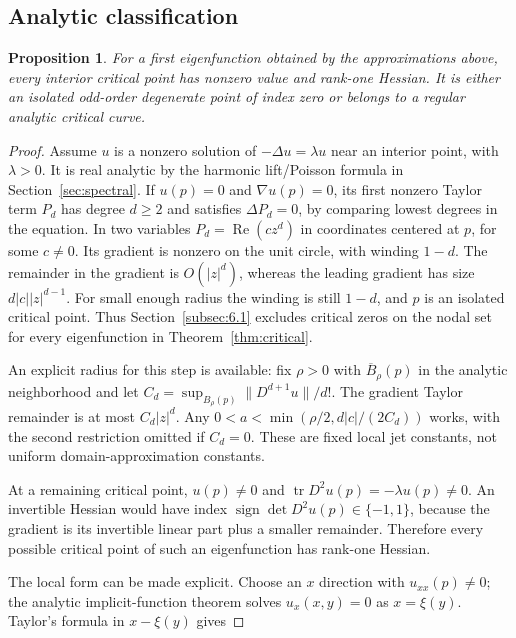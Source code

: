 \documentclass[11pt]{article}
\newtheorem{proposition}[theorem]{Proposition}
\theoremstyle{definition}
\theoremstyle{remark}
\numberwithin{equation}{section}
\begin{document}
\subsection{Analytic classification}\label{subsec:6.2}
\begin{proposition}\label{prop:critical-form}
For a first eigenfunction obtained by the approximations above, every interior critical point has nonzero value and rank-one Hessian. It is either an isolated odd-order degenerate point of index zero or belongs to a regular analytic critical curve.
\end{proposition}
\begin{proof}

Assume $u$ is a nonzero solution of $-\Delta u=\lambda u$ near an interior point, with $\lambda>0$. It is real analytic by the harmonic lift/Poisson formula in Section~\ref{sec:spectral}. If $u(p)=0$ and $\nabla u(p)=0$, its first nonzero Taylor term $P_d$ has degree $d\ge2$ and satisfies $\Delta P_d=0$, by comparing lowest degrees in the equation. In two variables $P_d=\operatorname{Re}(c z^d)$ in coordinates centered at $p$, for some $c\ne0$. Its gradient is nonzero on the unit circle, with winding $1-d$. The remainder in the gradient is $O(|z|^d)$, whereas the leading gradient has size $d|c||z|^{d-1}$. For small enough radius the winding is still $1-d$, and $p$ is an isolated critical point. Thus Section~\ref{subsec:6.1} excludes critical zeros on the nodal set for every eigenfunction in Theorem~\ref{thm:critical}.

An explicit radius for this step is available: fix $\rho>0$ with $\overline B_\rho(p)$ in the analytic neighborhood and let $C_d=\sup_{B_\rho(p)}\|D^{d+1}u\|/d!$. The gradient Taylor remainder is at most $C_d|z|^d$. Any $0<a<\min(\rho/2,d|c|/(2C_d))$ works, with the second restriction omitted if $C_d=0$. These are fixed local jet constants, not uniform domain-approximation constants.

At a remaining critical point, $u(p)\ne0$ and $\operatorname{tr}D^2u(p)=-\lambda u(p)\ne0$. An invertible Hessian would have index $\operatorname{sign}\det D^2u(p)\in\{-1,1\}$, because the gradient is its invertible linear part plus a smaller remainder. Therefore every possible critical point of such an eigenfunction has rank-one Hessian.

The local form can be made explicit. Choose an $x$ direction with $u_{xx}(p)\ne0$; the analytic implicit-function theorem solves $u_x(x,y)=0$ as $x=\xi(y)$. Taylor's formula in $x-\xi(y)$ gives


\end{proof}
\end{document}
